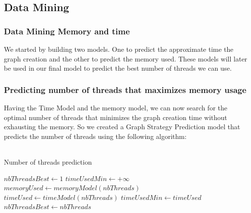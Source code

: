 \subsection{Data Mining}

\subsubsection{Data Mining Memory and time}

We started by building two models. One to predict the approximate time the graph creation and the other to predict the memory used. These models will later be used in our final model to predict the best number of threads we can use.

\subsubsection{Predicting number of threads that maximizes memory usage}

Having the Time Model and the memory model, we can now search for the optimal number of threads that minimizes the graph creation time without exhausting the memory. So we created a Graph Strategy Prediction model that predicts the number of threads using the following algorithm:
\\
\\

\begin{algorithm}
\caption{Number of threads prediction}\label{alg:cap}
    \begin{algorithmic}
        \State $nbThreadsBest \gets 1$
        \State $timeUsedMin \gets +\infty$
            \State $memoryUsed \gets memoryModel(nbThreads)$
            \State $timeUsed \gets timeModel(nbThreads)$
                    \State $timeUsedMin \gets timeUsed$
                    \State $nbThreadsBest \gets nbThreads$
                \EndIf
            \EndIf
        \EndWhile
    \end{algorithmic}
\end{algorithm}


